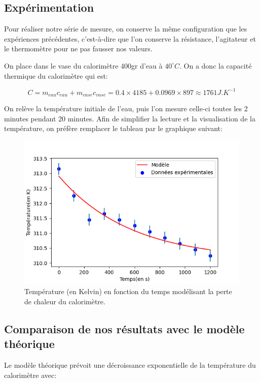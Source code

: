 \documentclass[12pt]{article}
\begin{document}
\subsection{Expérimentation}

Pour réaliser notre série de mesure, on conserve la même configuration que les expériences précédentes, c'est-à-dire
que l'on conserve la résistance, l'agitateur et le thermomètre pour ne pas fausser nos valeurs. 

On place dans le vase du calorimètre 400gr d'eau à $40^\circ C$. On a donc la capacité thermique du calorimètre qui est:

\begin{equation}
	C = m_{eau}c_{eau} + m_{vase}c_{vase} = 0.4 \times 4185 + 0.0969 \times 897 \approx 1761 J.K^{-1}
\end{equation}

On relève la température initiale de l'eau, puis l'on mesure celle-ci toutes les 2 minutes pendant 20 minutes.
Afin de simplifier la lecture et la visualisation de la température, on préfère remplacer le tableau par le graphique suivant:

\begin{figure}[h!]
	\begin{center}
		\includegraphics[scale=0.64]{img/Figure_2.png}
	\end{center}
	\label{fig:graph2}
	\caption{Température (en Kelvin) en fonction du temps modélisant la perte de chaleur du calorimètre.}
\end{figure}

\newpage
\subsection{Comparaison de nos résultats avec le modèle théorique}
Le modèle théorique prévoit une décroissance exponentielle de la température du calorimètre avec:
\end{document}
